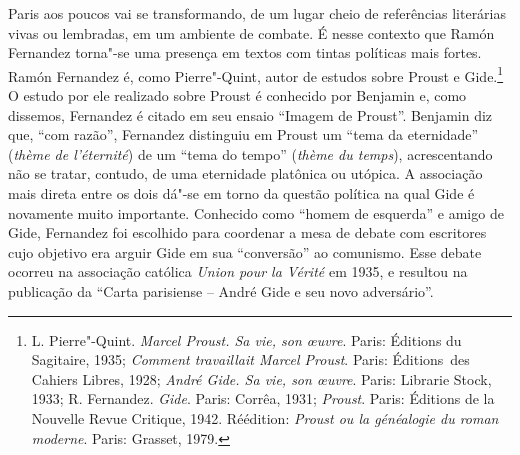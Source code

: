 Paris aos poucos vai se transformando, de um lugar cheio de referências
literárias vivas ou lembradas, em um ambiente de combate. É nesse
contexto que Ramón Fernandez torna"-se uma presença em textos com tintas
políticas mais fortes. Ramón Fernandez é, como Pierre"-Quint, autor de
estudos sobre Proust e Gide.\footnote{L. Pierre"-Quint. \emph{Marcel
  Proust. Sa vie, son \oe uvre}. Paris: Éditions du Sagitaire, 1935;
  \emph{Comment travaillait Marcel Proust}. Paris: Éditions~des Cahiers Libres,
1928; \emph{André Gide. Sa vie, son \oe uvre}. Paris: Librarie
  Stock, 1933; R. Fernandez. \emph{Gide}. Paris: Corrêa, 1931;
  \emph{Proust}. Paris: Éditions de la Nouvelle Revue Critique, 1942.
  Réédition: \emph{Proust ou la généalogie du roman moderne}. Paris: Grasset,
  1979.} O estudo por ele realizado sobre Proust é conhecido por
Benjamin e, como dissemos, Fernandez é citado em seu ensaio ``Imagem de
Proust''. Benjamin diz que, ``com razão'', Fernandez distinguiu em
Proust um ``tema da eternidade'' (\emph{thème de l'éternité}) de um
``tema do tempo'' (\emph{thème du temps}), acrescentando não se tratar,
contudo, de uma eternidade platônica ou utópica. A associação mais
direta entre os dois dá"-se em torno da questão política na qual Gide é
novamente muito importante. Conhecido como ``homem de esquerda'' e amigo
de Gide, Fernandez foi escolhido para coordenar a mesa de debate com
escritores cujo objetivo era arguir Gide em sua ``conversão'' ao
comunismo. Esse debate ocorreu na associação católica \emph{Union pour la
Vérité} em 1935, e resultou na publicação da ``Carta parisiense  --
André Gide e seu novo adversário''.

